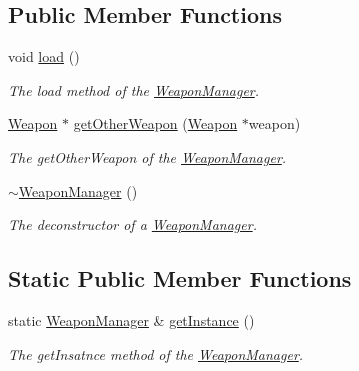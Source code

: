\subsection*{Public Member Functions}
\begin{DoxyCompactItemize}
\item 
void \hyperlink{class_weapon_manager_a6c96a12d89dc2e500fe830ce58d59d00}{load} ()
\begin{DoxyCompactList}\small\item\em The load method of the \hyperlink{class_weapon_manager}{Weapon\+Manager}. \end{DoxyCompactList}\item 
\hyperlink{class_weapon}{Weapon} $\ast$ \hyperlink{class_weapon_manager_a06a726626541c01ed4074e3a02d2d1fc}{get\+Other\+Weapon} (\hyperlink{class_weapon}{Weapon} $\ast$weapon)
\begin{DoxyCompactList}\small\item\em The get\+Other\+Weapon of the \hyperlink{class_weapon_manager}{Weapon\+Manager}. \end{DoxyCompactList}\item 
\hypertarget{class_weapon_manager_a240f037e5294e11081ca3cce1ab4651e}{\hyperlink{class_weapon_manager_a240f037e5294e11081ca3cce1ab4651e}{$\sim$\+Weapon\+Manager} ()}\label{class_weapon_manager_a240f037e5294e11081ca3cce1ab4651e}

\begin{DoxyCompactList}\small\item\em The deconstructor of a \hyperlink{class_weapon_manager}{Weapon\+Manager}. \end{DoxyCompactList}\end{DoxyCompactItemize}
\subsection*{Static Public Member Functions}
\begin{DoxyCompactItemize}
\item 
static \hyperlink{class_weapon_manager}{Weapon\+Manager} \& \hyperlink{class_weapon_manager_a397c93681bbba0a24f285d2e699b82f3}{get\+Instance} ()
\begin{DoxyCompactList}\small\item\em The get\+Insatnce method of the \hyperlink{class_weapon_manager}{Weapon\+Manager}. \end{DoxyCompactList}\end{DoxyCompactItemize}

